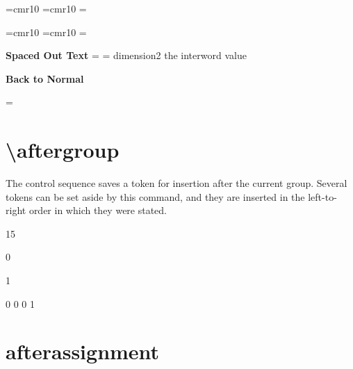 \begin{teX}
\font \roman=cmr10
\font\specroman=cmr10
\newdimen\savedvalue
\savedvalue=\roman
\newdimen\specialvalue
\specialvalue=13.0pt
\def \rm{%
  \fontdimen2\roman=\savedvalue }
\def\specrm{%
  \aftergroup\restoredimen
  \fontdimen2\specroman=\specialvalue
  \specroman  }
\def\restoredimen{%
\fontdimen2\roman=\savedvalue }
\end{teX}
{
\font \roman=cmr10
\font\specroman=cmr10
\newdimen\savedvalue
\savedvalue=\roman
\newdimen\specialvalue
\specialvalue=13.0pt
\def \rm{%
  \fontdimen2\roman=\savedvalue }
\def\specrm{%
  \aftergroup\restoredimen
  \fontdimen2\specroman=\specialvalue
  \specroman  }
\def\restoredimen{%
\roman=\savedvalue }


{\bf Spaced Out Text} 
\medskip
{\specrm \lorem} dimension2 the interword   value \the{}\font


{\bf  Back to Normal}
\medskip

\rm
\lorem

}

\section{\textbackslash aftergroup}

The  control sequence saves a token for insertion after the current group. Several
tokens can be set aside by this command, and they are inserted in the left-to-right order in which
they were stated.

\begin{texexample}{}{}
\def\x#1;{#1}
\def\y{15}
{
\bgroup
   \def\y{0}
   \aftergroup\x\aftergroup\y\aftergroup;
   \aftergroup}
\egroup
\y



\def\z{1}
{\def\z{0}
\z
}

\z

\end{texexample}

\begin{texexample}{}{}
{ \def\z{1}
  {\def\z{0}
     \z
    {
	\z
    }
   \z
  }
 \z
}
\end{texexample}
\section{afterassignment}

